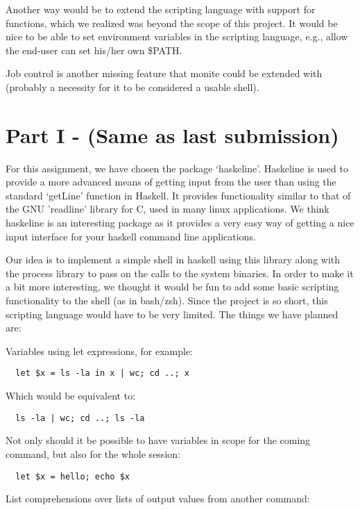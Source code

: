 \documentclass[11pt,a4paper]{article}
\begin{document}
Another way would be to extend the scripting language with support for
functions, which we realized was beyond the scope of this project. It would be
nice to be able to set environment variables in the scripting language, e.g.,
allow the end-user can set his/her own \$PATH.

Job control is another missing feature that monite could be extended with
(probably a necessity for it to be considered a usable shell).

\appendix

\section{Part I - (Same as last submission)}
For this assignment, we have chosen the package ‘haskeline’. Haskeline is used
to provide a more advanced means of getting input from the user than using the
standard ‘getLine’ function in Haskell. It provides functionality similar to
that of the GNU 'readline' library for C, used in many linux applications. We
think haskeline is an interesting package as it provides a very easy way of
getting a nice input interface for your haskell command line applications.

Our idea is to implement a simple shell in haskell using this library along with
the process library to pass on the calls to the system binaries. In order to
make it a bit more interesting, we thought it would be fun to add some basic
scripting functionality to the shell (as in bash/zsh). Since the project is so
short, this scripting language would have to be very limited. The things we have
planned are:

Variables using let expressions, for example:
\begin{verbatim}
  let $x = ls -la in x | wc; cd ..; x
\end{verbatim}

Which would be equivalent to:

\begin{verbatim}
  ls -la | wc; cd ..; ls -la
\end{verbatim}

Not only should it be possible to have variables in scope for the coming
command, but also for the whole session:

\begin{verbatim}
  let $x = hello; echo $x
\end{verbatim}

List comprehensions over lists of output values from another command:
\end{document}
